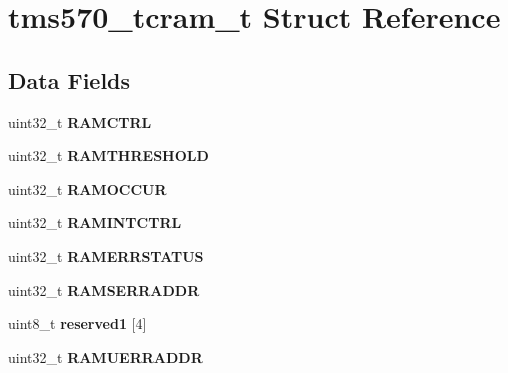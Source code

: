 \hypertarget{structtms570__tcram__t}{}\section{tms570\+\_\+tcram\+\_\+t Struct Reference}
\label{structtms570__tcram__t}
\subsection*{Data Fields}
\begin{DoxyCompactItemize}
\item 
\mbox{\label{structtms570__tcram__t_a9fa529a21ac6b12097ddbefdf335ab6d}} 
uint32\+\_\+t {\bfseries R\+A\+M\+C\+T\+RL}
\item 
\mbox{\label{structtms570__tcram__t_a078febb12be9b97e48fc7fac01c1c0b7}} 
uint32\+\_\+t {\bfseries R\+A\+M\+T\+H\+R\+E\+S\+H\+O\+LD}
\item 
\mbox{\label{structtms570__tcram__t_a6b7373fdb0e171a1fadb184f9446eaf6}} 
uint32\+\_\+t {\bfseries R\+A\+M\+O\+C\+C\+UR}
\item 
\mbox{\label{structtms570__tcram__t_a971f4e3d5f252318156dd565c56f773d}} 
uint32\+\_\+t {\bfseries R\+A\+M\+I\+N\+T\+C\+T\+RL}
\item 
\mbox{\label{structtms570__tcram__t_ab19ff6b0e501ae747f89748517653e4f}} 
uint32\+\_\+t {\bfseries R\+A\+M\+E\+R\+R\+S\+T\+A\+T\+US}
\item 
\mbox{\label{structtms570__tcram__t_a7571d7538e36654f957327181086244e}} 
uint32\+\_\+t {\bfseries R\+A\+M\+S\+E\+R\+R\+A\+D\+DR}
\item 
\mbox{\label{structtms570__tcram__t_a6cd5facd43771613a3637324306e405b}} 
uint8\+\_\+t {\bfseries reserved1} \mbox{[}4\mbox{]}
\item 
\mbox{\label{structtms570__tcram__t_aa5b7a0d966e62fd590d7ce90ba37364a}} 
uint32\+\_\+t {\bfseries R\+A\+M\+U\+E\+R\+R\+A\+D\+DR}
\item 
\mbox{\label{structtms570__tcram__t_acc4e61497095c005ef1fc6b806eaccff}} 

\end{DoxyCompactItemize}
